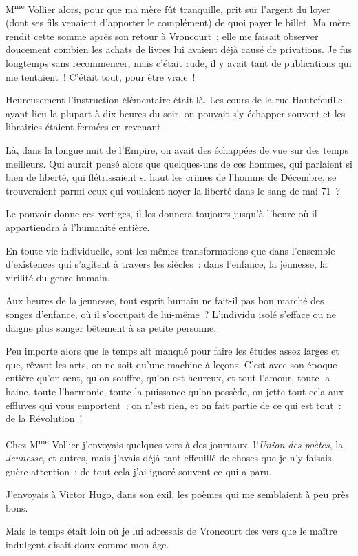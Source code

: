 \documentclass[french,twoside]{book} %
\begin{document}
 M\textsuperscript{me} Vollier alors, pour que ma mère fût tranquille, prit sur l’argent du loyer (dont ses fils venaient d’apporter le complément) de quoi payer le billet. Ma mère rendit cette somme après son retour à Vroncourt ; elle me faisait observer doucement combien les achats de livres lui avaient déjà causé de privations. Je fus longtemps sans recommencer, mais c’était rude, il y avait tant de publications qui me tentaient ! C’était tout, pour être vraie !\par
Heureusement l’instruction élémentaire était là. Les cours de la rue Hautefeuille ayant lieu la plupart à dix heures du soir, on pouvait s’y échapper souvent et les librairies étaient fermées en revenant.\par
Là, dans la longue nuit de l’Empire, on avait des échappées de vue sur des temps meilleurs. Qui aurait pensé alors que quelques-uns de ces hommes, qui parlaient si bien de liberté, qui flétrissaient si haut les crimes de l’homme de Décembre, se trouveraient parmi ceux qui voulaient noyer la liberté dans le sang de mai 71 ?\par
Le pouvoir donne ces vertiges, il les donnera toujours jusqu’à l’heure où il appartiendra à l’humanité entière.\par
En toute vie individuelle, sont les mêmes transformations que dans l’ensemble d’existences qui  s’agitent à travers les siècles : dans l’enfance, la jeunesse, la virilité du genre humain.\par
Aux heures de la jeunesse, tout esprit humain ne fait-il pas bon marché des songes d’enfance, où il s’occupait de lui-même ? L’individu isolé s’efface ou ne daigne plus songer bêtement à sa petite personne.\par
Peu importe alors que le temps ait manqué pour faire les études assez larges et que, rêvant les arts, on ne soit qu’une machine à leçons. C’est avec son époque entière qu’on sent, qu’on souffre, qu’on est heureux, et tout l’amour, toute la haine, toute l’harmonie, toute la puissance qu’on possède, on jette tout cela aux effluves qui vous emportent ; on n’est rien, et on fait partie de ce qui est tout : de la Révolution !\par
Chez M\textsuperscript{me} Vollier j’envoyais quelques vers à des journaux, l’\emph{Union des poètes}, la \emph{Jeunesse}, et autres, mais j’avais déjà tant effeuillé de choses que je n’y faisais guère attention ; de tout cela j’ai ignoré souvent ce qui a paru.\par
J’envoyais à Victor Hugo, dans son exil, les poèmes qui me semblaient à peu près bons.\par
Mais le temps était loin où je lui adressais de Vroncourt des vers que le maître indulgent disait doux comme mon âge.\par
 
\end{document}
